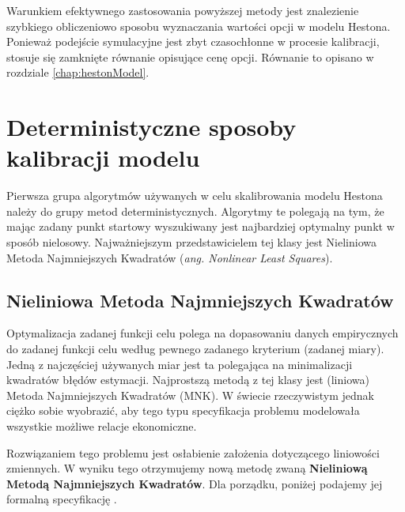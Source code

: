 \documentclass{pracamgr}
\begin{document}
Warunkiem efektywnego zastosowania powyższej metody jest znalezienie szybkiego obliczeniowo sposobu 
wyznaczania wartości opcji w 
modelu Hestona. Ponieważ podejście symulacyjne jest zbyt czasochłonne w procesie kalibracji, stosuje 
się zamknięte równanie opisujące cenę opcji. Równanie to opisano w rozdziale \ref{chap:hestonModel}.


\section{Deterministyczne sposoby kalibracji modelu} 
Pierwsza grupa algorytmów używanych w celu skalibrowania modelu Hestona należy do grupy metod 
deterministycznych.
Algorytmy te polegają na tym, że mając zadany punkt startowy wyszukiwany jest najbardziej optymalny
punkt w sposób nielosowy.
Najważniejszym przedstawicielem tej klasy jest Nieliniowa Metoda Najmniejszych Kwadratów 
(\textit{ang. Nonlinear Least Squares}).


\subsection{Nieliniowa Metoda Najmniejszych Kwadratów }

Optymalizacja zadanej funkcji celu polega na dopasowaniu danych empirycznych do zadanej funkcji celu 
według pewnego zadanego kryterium (zadanej miary). 
Jedną z najczęściej używanych miar jest ta polegająca na minimalizacji kwadratów błędów estymacji. 
Najprostszą metodą z tej klasy jest (liniowa) Metoda Najmniejszych Kwadratów (MNK).  W świecie rzeczywistym jednak ciężko sobie wyobrazić, aby tego typu 
specyfikacja problemu modelowała wszystkie możliwe relacje ekonomiczne. 

Rozwiązaniem tego problemu jest osłabienie założenia dotyczącego liniowości zmiennych. W wyniku tego 
otrzymujemy nową metodę zwaną \textbf{Nieliniową Metodą Najmniejszych Kwadratów}.
Dla porządku, poniżej podajemy jej formalną specyfikację  \cite{NLS}.
\end{document}
